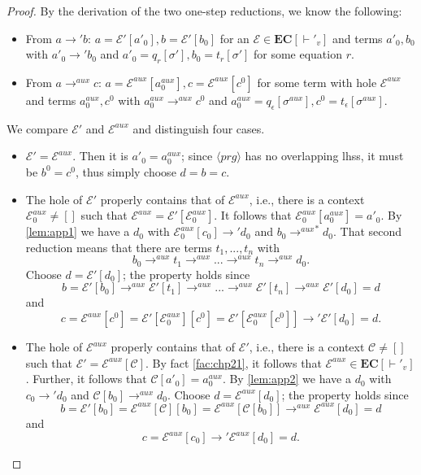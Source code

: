 \cdpaux*
\begin{proof}
\label{prf:cdpaux}
By the derivation of the two one-step reductions, we know the following:
\begin{itemize}
\item From $a \longrightarrow' b$: $a = \mathcal{E}'[a'_0], b = \mathcal{E}'[b_0]$ for an $\mathcal{E} \in \mathbf{EC}[\vdash'_v]$ and terms $a'_0, b_0$ with $a'_0 \longrightarrow' b_0$ and $a'_0 = q_r[\sigma'], b_0 = t_r[\sigma']$ for some equation $r$.

\item From $a \longrightarrow^{aux} c$: $a = \mathcal{E}^{aux}[a^{aux}_0], c = \mathcal{E}^{aux}[c^0]$ for some term with hole $\mathcal{E}^{aux}$ and terms $a^{aux}_0, c^0$ with $a^{aux}_0 \longrightarrow^{aux} c^0$ and $a^{aux}_0 = q_\epsilon[\sigma^{aux}], c^0 = t_\epsilon[\sigma^{aux}]$.
\end{itemize}

We compare $\mathcal{E}'$ and $\mathcal{E}^{aux}$ and distinguish four cases.
\begin{itemize}
\item $\mathcal{E}' = \mathcal{E}^{aux}$. Then it is $a'_0 = a^{aux}_0$; since $\langle prg \rangle$ has no overlapping lhss, it must be $b^0 = c^0$, thus simply choose $d = b = c$.

\item The hole of $\mathcal{E}'$ properly contains that of $\mathcal{E}^{aux}$, i.e., there is a context $\mathcal{E}^{aux}_0 \neq []$ such that $\mathcal{E}^{aux} = \mathcal{E}'[\mathcal{E}^{aux}_0]$. It follows that $\mathcal{E}^{aux}_0[a^{aux}_0] = a'_0$. By \autoref{lem:app1} we have a $d_0$ with $\mathcal{E}^{aux}_0[c_0] \longrightarrow' d_0$ and $b_0 {\longrightarrow^{aux}}^* d_0$. That second reduction means that there are terms $t_1, ..., t_n$ with
\[
b_0 \longrightarrow^{aux} t_1 \longrightarrow^{aux} ... \longrightarrow^{aux} t_n \longrightarrow^{aux} d_0.
\]
Choose $d = \mathcal{E}'[d_0]$; the property holds since
\[
b = \mathcal{E}'[b_0] \longrightarrow^{aux} \mathcal{E}'[t_1] \longrightarrow^{aux} ... \longrightarrow^{aux} \mathcal{E}'[t_n] \longrightarrow^{aux} \mathcal{E}'[d_0] = d
\]
and
\[
c = \mathcal{E}^{aux}[c^0] = \mathcal{E}'[\mathcal{E}^{aux}_0][c^0] = \mathcal{E}'[\mathcal{E}^{aux}_0[c^0]] \longrightarrow' \mathcal{E}'[d_0] = d.
\]

\item The hole of $\mathcal{E}^{aux}$ properly contains that of $\mathcal{E}'$, i.e., there is a context $\mathcal{C} \neq []$ such that $\mathcal{E}' = \mathcal{E}^{aux}[\mathcal{C}]$. By fact \autoref{fac:chp21}, it follows that $\mathcal{E}^{aux} \in \mathbf{EC}[\vdash'_v]$. Further, it follows that $\mathcal{C}[a'_0] = a^{aux}_0$. By \autoref{lem:app2} we have a $d_0$ with $c_0 \longrightarrow' d_0$ and $\mathcal{C}[b_0] \longrightarrow^{aux} d_0$. Choose $d = \mathcal{E}^{aux}[d_0]$; the property holds since
\[
b = \mathcal{E}'[b_0] = \mathcal{E}^{aux}[\mathcal{C}][b_0] = \mathcal{E}^{aux}[\mathcal{C}[b_0]] \longrightarrow^{aux} \mathcal{E}^{aux}[d_0] = d
\]
and
\[
c = \mathcal{E}^{aux}[c_0] \longrightarrow' \mathcal{E}^{aux}[d_0] = d.
\]


\end{itemize}
\end{proof}
